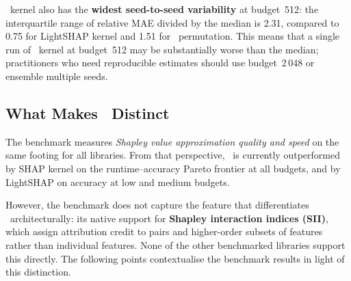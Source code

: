 \shapiq\ kernel also has the \textbf{widest seed-to-seed variability} at
budget~512: the interquartile range of relative MAE divided by the median
is 2.31, compared to 0.75 for LightSHAP kernel and 1.51 for
\shapiq\ permutation.
This means that a single run of \shapiq\ kernel at budget~512 may be
substantially worse than the median; practitioners who need reproducible
estimates should use budget~2\,048 or ensemble multiple seeds.


\subsection{What Makes \shapiq\ Distinct}
\label{sec:shapiq-distinction}

The benchmark measures \emph{Shapley value approximation quality and speed}
on the same footing for all libraries.
From that perspective, \shapiq\ is currently outperformed by SHAP kernel
on the runtime--accuracy Pareto frontier at all budgets, and by LightSHAP
on accuracy at low and medium budgets.

However, the benchmark does not capture the feature that differentiates
\shapiq\ architecturally: its native support for \textbf{Shapley
interaction indices (SII)}, which assign attribution credit to pairs and
higher-order subsets of features rather than individual features.
None of the other benchmarked libraries support this directly.
The following points contextualise the benchmark results in light of this
distinction.

